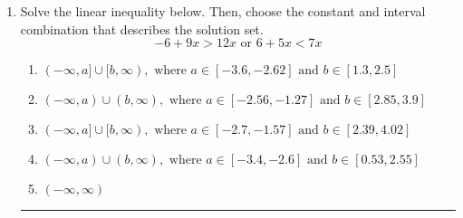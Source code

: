 \documentclass[14pt]{extbook}
\newcommand{\litem}[1]{\item#1\hspace*{-1cm}\rule{\textwidth}{0.4pt}}
\begin{document}
\begin{enumerate}
{\begin{enumerate}[label=\Alph*.]
\end{enumerate} }
\litem{
Solve the linear inequality below. Then, choose the constant and interval combination that describes the solution set.\[ -6 + 9 x > 12 x \text{ or } 6 + 5 x < 7 x \]\begin{enumerate}[label=\Alph*.]
\item \( (-\infty, a] \cup [b, \infty), \text{ where } a \in [-3.6, -2.62] \text{ and } b \in [1.3, 2.5] \)
\item \( (-\infty, a) \cup (b, \infty), \text{ where } a \in [-2.56, -1.27] \text{ and } b \in [2.85, 3.9] \)
\item \( (-\infty, a] \cup [b, \infty), \text{ where } a \in [-2.7, -1.57] \text{ and } b \in [2.39, 4.02] \)
\item \( (-\infty, a) \cup (b, \infty), \text{ where } a \in [-3.4, -2.6] \text{ and } b \in [0.53, 2.55] \)
\item \( (-\infty, \infty) \)

\end{enumerate} }
\end{enumerate}
\end{document}
